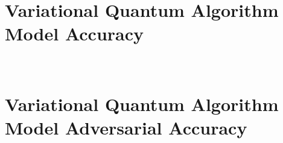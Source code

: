 \section{Variational Quantum Algorithm Model Accuracy}\label{section:vqa_accuracy} \


\section{Variational Quantum Algorithm Model Adversarial Accuracy}\label{section:vqa_adversarial_accuracy} \

